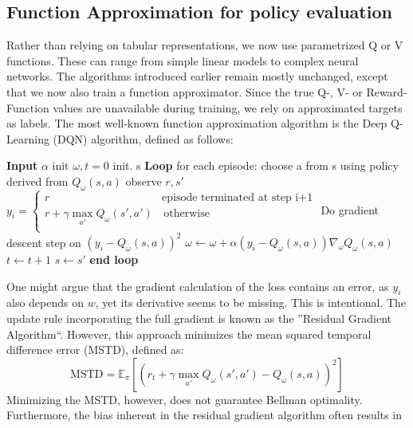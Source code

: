   \subsection{Function Approximation for policy evaluation}
  Rather than relying on tabular representations, we now use parametrized Q or V functions.
  These can range from simple linear models to complex neural networks. The algorithms introduced
  earlier remain mostly unchanged, except that we now also train a function approximator. 
  Since the true Q-, V- or Reward-Function values are unavailable during training, we rely on approximated
  targets as labels. The most well-known function approximation algorithm is
  the Deep Q-Learning (DQN) algorithm, defined as follows:
  \begin{algorithm}[H]
    \large
    \caption{Vanilla Deep-Q-Learning (DQN)}\label{vanilla_dqn}
    \begin{algorithmic}
      \STATE \textbf{Input} $\alpha$
      \STATE $\text{init } \omega , t = 0$
      \STATE init. s
      \STATE \textbf{Loop} for each episode:
      \STATE \quad choose a from s using policy derived from $Q_\omega(s,a)$
      \STATE \quad observe $r,s'$ 
      \STATE \quad $y_i = \left\{
	\begin{array}{ll}
	  r & \text{episode terminated at step i+1} \\
	  r + \gamma \max\limits_{a'}Q_\omega(s',a') & \, \textrm{otherwise} \\
	\end{array}
      \right. $
      \STATE \quad Do gradient descent step on $(y_i- Q_\omega(s,a))^2$ 
      \STATE \quad  $\omega \gets \omega + \alpha (y_i -  Q_\omega(s,a))\nabla_\omega  Q_{\omega}(s,a)$
      \STATE \quad $t \gets t+1$
      \STATE \quad $s \gets s'$
      \STATE \textbf{end loop}
    \end{algorithmic}
  \end{algorithm}
  One might argue that the gradient calculation of the loss contains an error, 
  as $y_i$ also depends on $w$, yet its derivative seems to be missing. This is intentional.
  The update rule incorporating the full gradient is known as the ''Residual Gradient Algorithm``. 
  However, this approach minimizes the mean squared temporal difference error (MSTD), defined as:
  $$ \text{MSTD} = \mathbb{E}_\pi\left[\left(r_t+\gamma \max\limits_{a'}Q_\omega(s',a')-Q_\omega(s, a)
  \right)^2\right] \label{MSTD}$$ Minimizing the MSTD, however, does not guarantee Bellman optimality. 
  Furthermore, the bias inherent in the residual gradient algorithm often results in 
